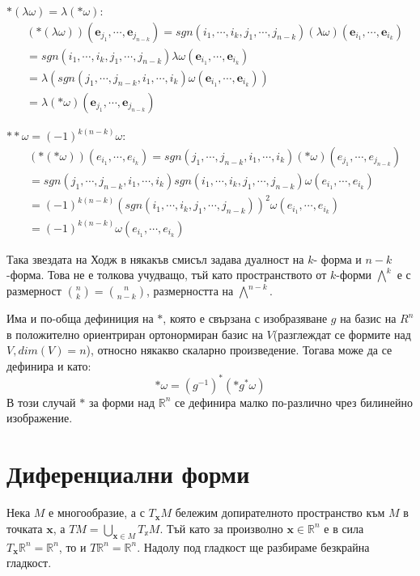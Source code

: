 \documentclass[12pt]{article}
\begin{document}
\begin{large}
$\ast (\lambda\omega) = \lambda(\ast\omega)$:
\begin{align*}
&(\ast (\lambda\omega))(\mathbf{e}_{j_1},\cdots, \mathbf{e}_{j_{n-k}}) = sgn(i_1,\cdots,i_k,j_1,\cdots,j_{n-k}) (\lambda\omega)(\mathbf{e}_{i_1},\cdots,\mathbf{e}_{i_k}) \\
&=sgn(i_1,\cdots,i_k,j_1,\cdots,j_{n-k})\lambda\omega(\mathbf{e}_{i_1},\cdots,\mathbf{e}_{i_k}) \\
&=\lambda(sgn(j_1,\cdots,j_{n-k},i_1,\cdots,i_k)\omega(\mathbf{e}_{i_1},\cdots,\mathbf{e}_{i_k})) \\
&=\lambda(\ast \omega)(\mathbf{e}_{j_1},\cdots, \mathbf{e}_{j_{n-k}})
\end{align*}

$\ast \ast \omega = (-1)^{k(n-k)} \omega$:
\begin{align*}
&(\ast (\ast \omega))(e_{i_1},\cdots,e_{i_k})=sgn(j_1,\cdots,j_{n-k},i_1,\cdots,i_k)(\ast \omega)(e_{j_1},\cdots, e_{j_{n-k}}) \\
&=sgn(j_1,\cdots,j_{n-k},i_1,\cdots,i_k) sgn(i_1,\cdots,i_k,j_1,\cdots,j_{n-k})\omega(e_{i_1},\cdots,e_{i_k}) \\
&=(-1)^{k(n-k)}(sgn(i_1,\cdots,i_k,j_1,\cdots,j_{n-k}))^2\omega(e_{i_1},\cdots,e_{i_k}) \\
&=(-1)^{k(n-k)}\omega(e_{i_1},\cdots,e_{i_k})
\end{align*} 

Така звездата на Ходж в някакъв смисъл задава дуалност на $k$- форма и $n-k$-форма. Това не е толкова учудващо, тъй като пространството от $k$-форми ${\bigwedge}^k$ е с размерност $\binom{n}{k}=\binom{n}{n-k}$, размерността на  ${\bigwedge}^{n-k}$.

Има и по-обща дефиниция на $\ast$, която е свързана с изобразяване $g$ на базис на $R^n$ в положително ориентриран ортонормиран базис на $V$(разглеждат се формите над $V, dim(V)=n$), относно някакво скаларно произведение. Тогава може да се дефинира и като:
\[
\ast \omega = (g^{-1})^*(\ast g^* \omega)
\]
В този случай $\ast$  за форми над $\mathbb{R}^n$ се дефинира малко по-различно чрез билинейно изображение.


\section{Диференциални форми}
Нека $M$ е многообразие, а с $T_{\mathbf{x}}M$ бележим допирателното пространство към $M$ в точката ${\mathbf{x}}$, а $TM=\bigcup_{{\mathbf{x}} \in M}T_\mathbb{x} M$. Тъй като за произволно ${\mathbf{x}} \in \mathbb{R}^n$ е в сила $T_{\mathbf{x}} \mathbb{R}^n=\mathbb{R}^n$, то и $T\mathbb{R}^n=\mathbb{R}^n$.
Надолу под гладкост ще разбираме безкрайна гладкост.


\end{large}
\end{document}
